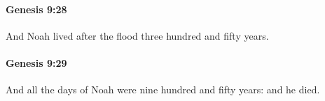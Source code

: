		\paragraph{Genesis 9:28} %
			\label{GENESIS-9-28}

			And Noah lived after the flood three hundred and fifty years.


		\paragraph{Genesis 9:29} %
			\label{GENESIS-9-29}

			And all the days of Noah were nine hundred and fifty years: and he died.

